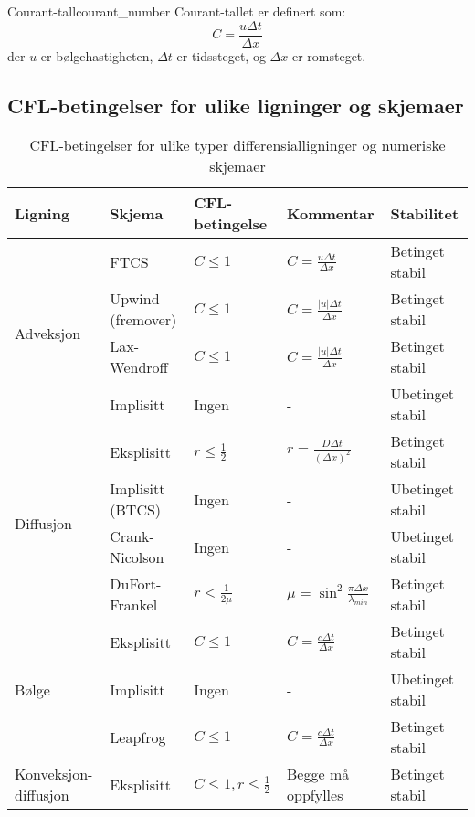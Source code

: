 \begin{definition}{Courant-tall}{courant_number}
	Courant-tallet er definert som:
	\begin{equation}
		C = \frac{u \Delta t}{\Delta x}
	\end{equation}
	der $u$ er bølgehastigheten, $\Delta t$ er tidssteget, og $\Delta x$ er romsteget.
\end{definition}

\subsection{CFL-betingelser for ulike ligninger og skjemaer}

\begin{table}[H]
	\centering
	\caption{CFL-betingelser for ulike typer differensialligninger og numeriske skjemaer}
	\begin{tabular}{lllll}
		\toprule
		\textbf{Ligning} & \textbf{Skjema} & \textbf{CFL-betingelse} & \textbf{Kommentar} & \textbf{Stabilitet} \\
		\midrule
		\multirow{4}{*}{Adveksjon} & FTCS & $C \leq 1$ & $C = \frac{u\Delta t}{\Delta x}$ & Betinget stabil \\
		& Upwind (fremover) & $C \leq 1$ & $C = \frac{|u|\Delta t}{\Delta x}$ & Betinget stabil \\
		& Lax-Wendroff & $C \leq 1$ & $C = \frac{|u|\Delta t}{\Delta x}$ & Betinget stabil \\
		& Implisitt & Ingen & - & Ubetinget stabil \\
		\midrule
		\multirow{4}{*}{Diffusjon} & Eksplisitt & $r \leq \frac{1}{2}$ & $r = \frac{D\Delta t}{(\Delta x)^2}$ & Betinget stabil \\
		& Implisitt (BTCS) & Ingen & - & Ubetinget stabil \\
		& Crank-Nicolson & Ingen & - & Ubetinget stabil \\
		& DuFort-Frankel & $r < \frac{1}{2\mu}$ & $\mu = \sin^2\frac{\pi\Delta x}{\lambda_{min}}$ & Betinget stabil \\
		\midrule
		\multirow{3}{*}{Bølge} & Eksplisitt & $C \leq 1$ & $C = \frac{c\Delta t}{\Delta x}$ & Betinget stabil \\
		& Implisitt & Ingen & - & Ubetinget stabil \\
		& Leapfrog & $C \leq 1$ & $C = \frac{c\Delta t}{\Delta x}$ & Betinget stabil \\
		\midrule
		\multirow{3}{*}{Konveksjon-diffusjon} & Eksplisitt & $C \leq 1, r \leq \frac{1}{2}$ & Begge må oppfylles & Betinget stabil \\

\end{tabular}
\end{table}
